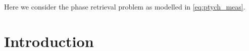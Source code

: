 
Here we consider the phase retrieval problem as modelled in \eqref{eq:ptych_meas}.
\newtheorem{lem}{Lemma}
\newtheorem{cor}{Corollary}
\newtheorem{thm}{Theorem}
\newtheorem{Def}{Definition}
\newtheorem{prop}{Proposition}


\def \a {\mathbf a}
\def \b {\mathbf b}
\def \x {\mathbf x}
\def \z {\mathbf z}
\def \y {\mathbf y}
\def \u {\mathbf u}
\def \v {\mathbf v}
\def \X { X}
\def \Y { Y}
\def \m {\mathbf m}
\def \n {\mathbf n}
\newcommand{\tX}{\ensuremath{\widetilde{X}}}
\newcommand{\tx}{\ensuremath{\widetilde{\x}}}


\setcounter{MaxMatrixCols}{20}

\def\SmallColSep{\setlength{\arraycolsep}{0.8\arraycolsep}}


\section{Introduction}
\label{sec:intro}



